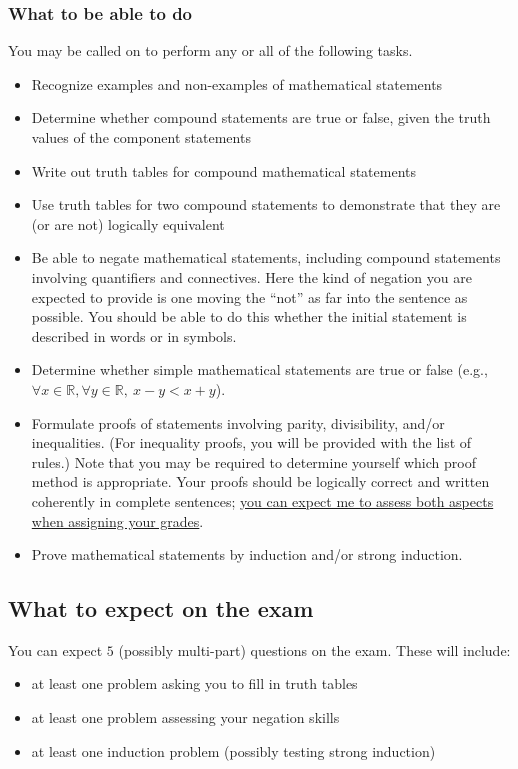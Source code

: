 \documentclass[12pt]{article}
\theoremstyle{plain}
\theoremstyle{remark}
\begin{document}
\subsubsection*{What to be able to do}
You may be called on to perform any or all of the following tasks.
\begin{itemize}
\item Recognize examples and non-examples of mathematical statements
\item Determine whether compound statements are true or false, given the truth values of the component statements
\item Write out truth tables for compound mathematical statements
\item Use truth tables for two compound statements to demonstrate that they are (or are not) logically equivalent
\item Be able to negate mathematical statements, including compound statements involving quantifiers and connectives. Here the kind of negation you are expected to provide is one moving the ``not'' as far into the sentence as possible. You should be able to do this whether the initial statement is described in words or in symbols.
\item Determine whether simple mathematical statements are true or false (e.g., $\forall x \in \mathbb{R}, \forall y \in\mathbb{R},~x - y < x+y$).
\item Formulate proofs of statements involving parity, divisibility, and/or inequalities. (For inequality proofs, you will be provided with the list of rules.) Note that you may be required to determine yourself which proof method is appropriate. Your proofs should be logically correct and written coherently in complete sentences; \ul{you can expect me to assess both aspects when assigning your 
grades}.
\item Prove mathematical statements by induction and/or strong induction.

\end{itemize}

\subsection*{What to expect on the exam}
You can expect $5$ (possibly multi-part) questions on the exam. These will include:
\begin{itemize}
\item at least one problem asking you to fill in truth tables
\item at least one problem assessing your negation skills
\item at least one induction problem (possibly testing strong induction)
\end{itemize}
\end{document}
